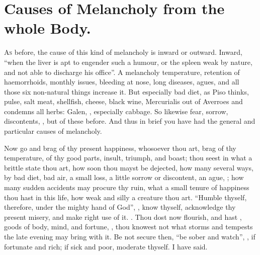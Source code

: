 \section{Causes of Melancholy from the whole Body.}

\lettrine{A}{s} before, the cause of this kind of melancholy is inward or
outward. Inward, \enquote{when the liver is apt to engender such a
humour, or the spleen weak by nature, and not able to discharge his office}. A
melancholy temperature, retention of haemorrhoids, monthly issues, bleeding at
nose, long diseases, agues, and all those six non-natural things increase it.
But especially bad diet, as Piso thinks, pulse, salt meat,
shellfish, cheese, black wine, \etc{} Mercurialis out of Averroes and \Avicenna{}
condemns all herbs: Galen, , especially cabbage. So likewise fear, sorrow, discontents, \etc{}, but of
these before. And thus in brief you have had the general and particular causes
of melancholy.

Now go and brag of thy present happiness, whosoever thou art, brag of thy
temperature, of thy good parts, insult, triumph, and boast; thou seest in what
a brittle state thou art, how soon thou mayst be dejected, how many several
ways, by bad diet, bad air, a small loss, a little sorrow or discontent, an
ague, \etc{}; how many sudden accidents may procure thy ruin, what a small
tenure of happiness thou hast in this life, how weak and silly a creature thou
art. \enquote{Humble thyself, therefore, under the mighty hand of God}, , know thyself, acknowledge thy present misery, and make right
use of it. . Thou dost now flourish, and hast
, goods of body, mind, and fortune,
, thou knowest not what storms and
tempests the late evening may bring with it. Be not secure then, \enquote{be sober and
watch}, , if fortunate and
rich; if sick and poor, moderate thyself. I have said.
